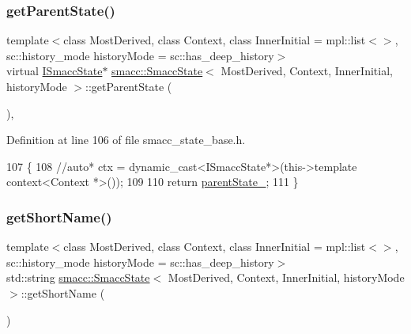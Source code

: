 \subsubsection{\texorpdfstring{get\+Parent\+State()}{getParentState()}}
{\footnotesize\ttfamily template$<$class Most\+Derived, class Context, class Inner\+Initial = mpl\+::list$<$$>$, sc\+::history\+\_\+mode history\+Mode = sc\+::has\+\_\+deep\+\_\+history$>$ \\
virtual \hyperlink{classsmacc_1_1ISmaccState}{I\+Smacc\+State}$\ast$ \hyperlink{classsmacc_1_1SmaccState}{smacc\+::\+Smacc\+State}$<$ Most\+Derived, Context, Inner\+Initial, history\+Mode $>$\+::get\+Parent\+State (\begin{DoxyParamCaption}{ }\end{DoxyParamCaption})\hspace{0.3cm}{\ttfamily [inline]}, {\ttfamily [virtual]}}



Definition at line 106 of file smacc\+\_\+state\+\_\+base.\+h.


\begin{DoxyCode}
107     \{
108       \textcolor{comment}{//auto* ctx = dynamic\_cast<ISmaccState*>(this->template context<Context *>());}
109 
110       \textcolor{keywordflow}{return} \hyperlink{classsmacc_1_1ISmaccState_ad61db41d8d06a836e7d1dac7767f5695}{parentState\_};
111     \}
\end{DoxyCode}
\mbox{\label{classsmacc_1_1SmaccState_a4db028a85244653e48957d2b3371413d}} 
\subsubsection{\texorpdfstring{get\+Short\+Name()}{getShortName()}}
{\footnotesize\ttfamily template$<$class Most\+Derived, class Context, class Inner\+Initial = mpl\+::list$<$$>$, sc\+::history\+\_\+mode history\+Mode = sc\+::has\+\_\+deep\+\_\+history$>$ \\
std\+::string \hyperlink{classsmacc_1_1SmaccState}{smacc\+::\+Smacc\+State}$<$ Most\+Derived, Context, Inner\+Initial, history\+Mode $>$\+::get\+Short\+Name (\begin{DoxyParamCaption}{ }\end{DoxyParamCaption})\hspace{0.3cm}{\ttfamily [inline]}}



